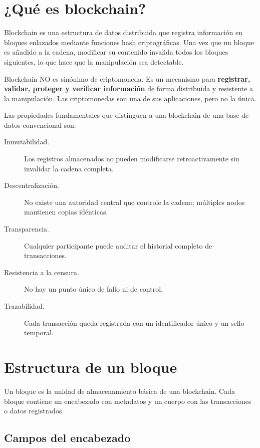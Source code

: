 \documentclass[
  coursetitle={Cómputo Nube y Tecnologías Emergentes},
  coursehours={96},
  coursedate={Verano 2026},
  doctype={Notas de clase},
  otherlangs={english,french},
  authorname={Lázaro},
  authorsurname={Bustio-Martínez},
  authortitle={PhD},
  role={Profesor Investigador},
  email={lbustio@inaoe.mx},
  phone={5559504000},
  ext={7459},
  institution={Instituto Nacional de Astrofísica, Óptica y Electrónica (INAOE)},
  department={Maestría en Ciencias en Tecnologías de Seguridad},
  address={Luis Enrique Erro 1, Sta. Ma. Tonantzintla, San Andrés Cholula, CP 72840, Puebla, México},
  margin={0.5in}
]{../../lbustio_lecture_notes}
\begin{document}
\IberoCover

\section{¿Qué es blockchain?}

Blockchain es una estructura de datos distribuida que registra información en bloques enlazados mediante funciones hash criptográficas. Una vez que un bloque es añadido a la cadena, modificar su contenido invalida todos los bloques siguientes, lo que hace que la manipulación sea detectable.

\begin{tcolorbox}[title=Concepto central]
Blockchain NO es sinónimo de criptomoneda. Es un mecanismo para \textbf{registrar, validar, proteger y verificar información} de forma distribuida y resistente a la manipulación. Las criptomonedas son una de sus aplicaciones, pero no la única.
\end{tcolorbox}

Las propiedades fundamentales que distinguen a una blockchain de una base de datos convencional son:

\begin{description}
  \item[Inmutabilidad.] Los registros almacenados no pueden modificarse retroactivamente sin invalidar la cadena completa.
  \item[Descentralización.] No existe una autoridad central que controle la cadena; múltiples nodos mantienen copias idénticas.
  \item[Transparencia.] Cualquier participante puede auditar el historial completo de transacciones.
  \item[Resistencia a la censura.] No hay un punto único de fallo ni de control.
  \item[Trazabilidad.] Cada transacción queda registrada con un identificador único y un sello temporal.
\end{description}

\section{Estructura de un bloque}

Un bloque es la unidad de almacenamiento básica de una blockchain. Cada bloque contiene un encabezado con metadatos y un cuerpo con las transacciones o datos registrados.

\subsection{Campos del encabezado}
\end{document}
